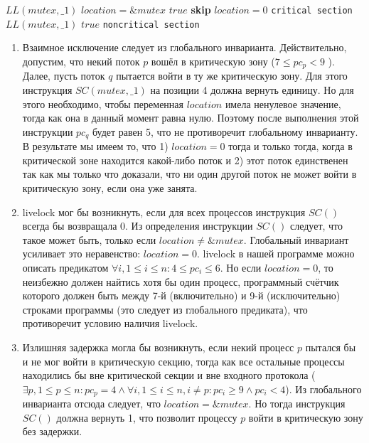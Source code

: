\documentclass{article}
\begin{document}
\begin{algorithmic}[1]
\State $ LL(mutex, \_1) $                           \Comment $ location = \&mutex $
                       \Comment $ true $
            \State \textbf{skip}
        \EndWhile                                   \Comment $ location = 0 $
        \State \texttt{critical section}
        \State $ LL(mutex, \_1)  $                  \Comment $ true $
        \State \texttt{noncritical section}
    \EndWhile
\EndProcedure
\end{algorithmic}

\begin{enumerate}
\item Взаимное исключение следует из глобального инварианта. Действительно, допустим, что некий поток \( p \) вошёл
      в критическую зону (\( 7 \leq pc_p < 9\) ). Далее, пусть поток \( q \) пытается войти в ту же критическую зону. Для
      этого инструкция \( SC(mutex, \_1) \) на позиции 4 должна вернуть единицу. Но для этого необходимо, чтобы переменная
      \( location \) имела ненулевое значение, тогда как она в данный момент равна нулю. Поэтому после выполнения этой
      инструкции \( pc_q \) будет равен 5, что не противоречит глобальному инварианту. В результате мы имеем то, что 1)
      \( location = 0 \) тогда и только тогда, когда в критической зоне находится какой-либо поток и 2) этот поток единственен
      так как мы только что доказали, что ни один другой поток не может войти в критическую зону, если она уже занята.
\item livelock мог бы возникнуть, если для всех процессов инструкция $ SC() $ всегда бы возвращала 0.  Из определения
      инструкции $ SC() $ следует, что такое может быть, только если $ location \neq \&mutex $. Глобальный инвариант 
      усиливает это неравенство: $ location = 0 $. livelock в нашей программе можно описать предикатом $ \forall i,
      1 \leq i \leq n : 4 \leq pc_i \leq 6 $. Но если $ location = 0 $, то неизбежно должен найтись хотя бы один процесс,
      программный счётчик которого должен быть между 7-й (включительно) и 9-й (исключительно) строками программы (это следует
      из глобального предиката), что противоречит условию наличия livelock.
\item Излишняя задержка могла бы возникнуть, если некий процесс $ p $ пытался бы и не мог войти в критическую секцию, тогда как
      все остальные процессы находились бы вне критической секции и вне входного протокола ($ \exists p, 1 \leq p \leq n : pc_p
      = 4 \land \forall i, 1 \leq i \leq n, i \neq p : pc_i \geq 9 \land pc_i < 4 $). Из глобального инварианта отсюда следует,
      что $ location = \&mutex $. Но тогда инструкция $ SC() $ должна вернуть 1, что позволит процессу $ p $ войти в критическую
      зону без задержки.
\end{enumerate}
\end{document}
